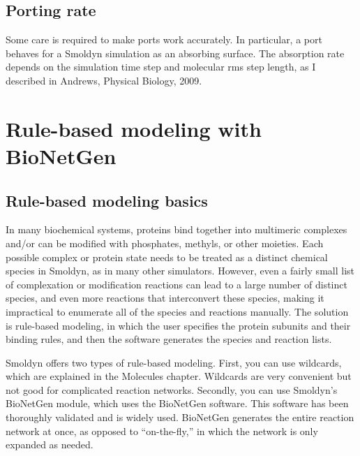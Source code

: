 \documentclass {book}
\begin{document}
\section{Porting rate}

Some care is required to make ports work accurately. In particular, a port behaves for a Smoldyn simulation as an absorbing surface. The absorption rate depends on the simulation time step and molecular rms step length, as I described in Andrews, Physical Biology, 2009.


\chapter{Rule-based modeling with BioNetGen}

\section{Rule-based modeling basics}

In many biochemical systems, proteins bind together into multimeric complexes and/or can be modified with phosphates, methyls, or other moieties. Each possible complex or protein state needs to be treated as a distinct chemical species in Smoldyn, as in many other simulators. However, even a fairly small list of complexation or modification reactions can lead to a large number of distinct species, and even more reactions that interconvert these species, making it impractical to enumerate all of the species and reactions manually. The solution is rule-based modeling, in which the user specifies the protein subunits and their binding rules, and then the software generates the species and reaction lists.

Smoldyn offers two types of rule-based modeling. First, you can use wildcards, which are explained in the Molecules chapter. Wildcards are very convenient but not good for complicated reaction networks. Secondly, you can use Smoldyn's BioNetGen module, which uses the BioNetGen software. This software has been thoroughly validated and is widely used. BioNetGen generates the entire reaction network at once, as opposed to ``on-the-fly,'' in which the network is only expanded as needed.
\end{document}
